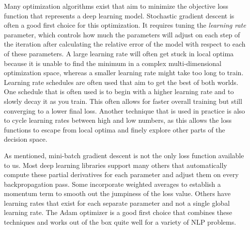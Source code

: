 Many optimization algorithms exist that aim to minimize the objective loss function that represents a deep learning model. Stochastic
gradient descent is often a good first choice for this optimization. It requires tuning the \textit{learning rate} parameter, which controls how much the parameters
will adjust on each step of the iteration after calculating the relative error of the model with respect to each of these parameters. A large learning rate
will often get stuck in local optima because it is unable to find the minimum in a complex multi-dimensional optimization space, whereas a smaller learning rate
might take too long to train. Learning rate schedules are often used that aim to get the best of both worlds. One schedule that is often used is to
begin with a higher learning rate and to slowly decay it as you train. This often allows for faster overall training but still converging to a lower final loss. 
Another technique that is used in practice is also to cycle learning rates between high and low numbers, as this allows the loss functions to escape
from local optima and finely explore other parts of the decision space.

As mentioned, mini-batch gradient descent is not the only loss function available to us. Most deep learning libraries support many others that
automatically compute these partial derivatives for each parameter and adjust them on every backpropagation pass. Some incorporate weighted averages to establish
a momentum term to smooth out the jumpiness of the loss value. Others have learning rates that exist for each separate parameter and not a single global learning rate.
The Adam optimizer is a good first choice that combines these techniques and works out of the box quite well for a variety of NLP problems.


